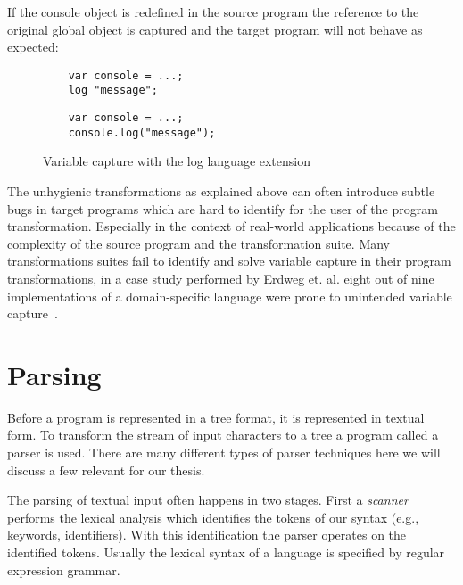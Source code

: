 If the console object is redefined in the source program the reference to the original global object is captured and the target program will not behave as expected:

\begin{figure}[!h]
\begin{minipage}[t]{0.45\textwidth}
	\begin{lstlisting}
	var console = ...;	
	log "message";
	\end{lstlisting}
\end{minipage}
\hfill
\begin{minipage}[t]{0.45\textwidth}
	\begin{lstlisting}
	var console = ...;	
	console.log("message");
	\end{lstlisting}
\end{minipage}
\caption{Variable capture with the log language extension}
\end{figure}

The unhygienic transformations as explained above can often introduce subtle bugs in target programs which are hard to identify for the user of the program transformation. Especially in the context of real-world applications because of the complexity of the source program and the transformation suite. Many transformations suites fail to identify and solve variable capture in their program transformations, in a case study performed by Erdweg et. al. eight out of nine implementations of a domain-specific language were prone to unintended variable capture~\cite{Erdweg2014a}.

\section{Parsing} \label{parsing}
Before a program is represented in a tree format, it is represented in textual form. To transform the stream of input characters to a tree a program called a parser is used. There are many different types of parser techniques\cite{Visser1997,VandenBrand2002,Salomon1989} here we will discuss a few relevant for our thesis.

The parsing of textual input often happens in two stages. First a \textit{scanner} performs the lexical analysis which identifies the tokens of our syntax (e.g., keywords, identifiers). With this identification the parser operates on the identified tokens. Usually the lexical syntax of a language is specified by regular expression grammar.

